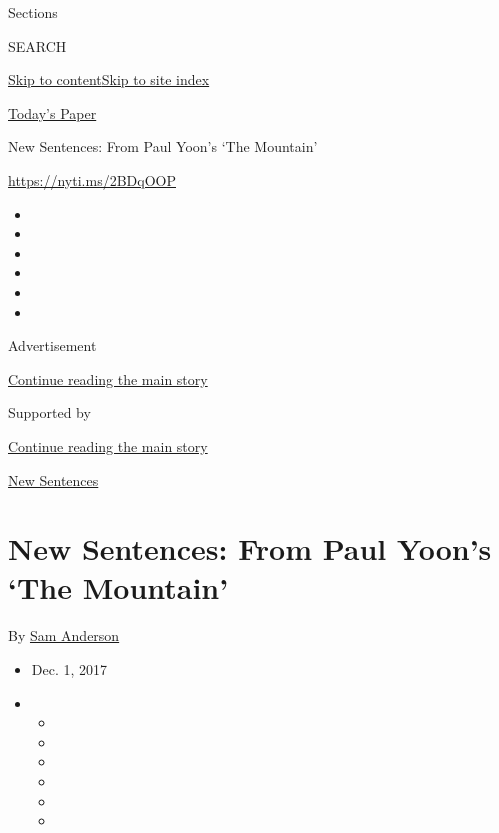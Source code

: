 Sections

SEARCH

\protect\hyperlink{site-content}{Skip to
content}\protect\hyperlink{site-index}{Skip to site index}

\href{https://myaccount.nytimes3xbfgragh.onion/auth/login?response_type=cookie\&client_id=vi}{}

\href{https://www.nytimes3xbfgragh.onion/section/todayspaper}{Today's
Paper}

New Sentences: From Paul Yoon's `The Mountain'

\url{https://nyti.ms/2BDqOOP}

\begin{itemize}
\item
\item
\item
\item
\item
\item
\end{itemize}

Advertisement

\protect\hyperlink{after-top}{Continue reading the main story}

Supported by

\protect\hyperlink{after-sponsor}{Continue reading the main story}

\href{/column/new-sentences}{New Sentences}

\hypertarget{new-sentences-from-paul-yoons-the-mountain}{%
\section{New Sentences: From Paul Yoon's `The
Mountain'}\label{new-sentences-from-paul-yoons-the-mountain}}

By \href{http://www.nytimes3xbfgragh.onion/by/sam-anderson}{Sam
Anderson}

\begin{itemize}
\item
  Dec. 1, 2017
\item
  \begin{itemize}
  \item
  \item
  \item
  \item
  \item
  \item
  \end{itemize}
\end{itemize}

